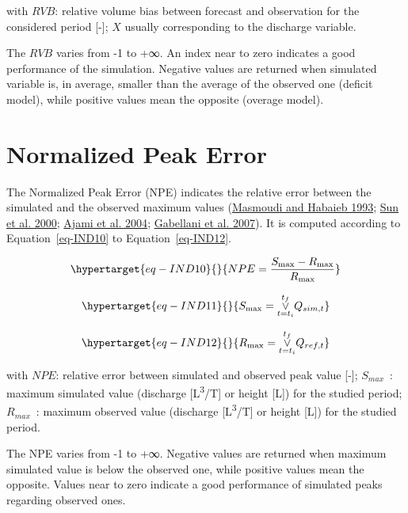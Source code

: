 \documentclass[
  letterpaper,
  DIV=11,
  numbers=noendperiod]{scrreprt}
\begin{document}
with \(RVB\): relative volume bias between forecast and observation for
the considered period {[}-{]}; \(X\) usually corresponding to the
discharge variable.

The \(RVB\) varies from -1 to +∞. An index near to zero indicates a good
performance of the simulation. Negative values are returned when
simulated variable is, in average, smaller than the average of the
observed one (deficit model), while positive values mean the opposite
(overage model).

\hypertarget{sec-tech_performance_indicators_npe}{%
\chapter{Normalized Peak
Error}\label{sec-tech_performance_indicators_npe}}

The Normalized Peak Error (NPE) indicates the relative error between the
simulated and the observed maximum values
(\protect\hyperlink{ref-masmoudi_performance_1993}{Masmoudi and Habaieb
1993}; \protect\hyperlink{ref-sun_flood_2000}{Sun et al. 2000};
\protect\hyperlink{ref-ajami_calibration_2004}{Ajami et al. 2004};
\protect\hyperlink{ref-gabellani_propagation_2007}{Gabellani et al.
2007}). It is computed according to Equation~\ref{eq-IND10} to
Equation~\ref{eq-IND12}.

\begin{equation}\protect\hypertarget{eq-IND10}{}{
NPE = \frac{S_{\max} - R_{\max}}{R_{\max}}
}\label{eq-IND10}\end{equation}

\begin{equation}\protect\hypertarget{eq-IND11}{}{
S_{\max} = \overset{t_{f}}{\underset{t = t_{i}}{\vee}}Q_{sim,t}
}\label{eq-IND11}\end{equation}

\begin{equation}\protect\hypertarget{eq-IND12}{}{
R_{\max} = \overset{t_{f}}{\underset{t = t_{i}}{\vee}}Q_{ref,t}
}\label{eq-IND12}\end{equation}

with \(NPE\): relative error between simulated and observed peak value
{[}-{]}; \(S_{max}\)~: maximum simulated value (discharge
{[}L\textsuperscript{3}/T{]} or height {[}L{]}) for the studied period;
\(R_{max}\)~: maximum observed value (discharge
{[}L\textsuperscript{3}/T{]} or height {[}L{]}) for the studied period.

The NPE varies from -1 to +∞. Negative values are returned when maximum
simulated value is below the observed one, while positive values mean
the opposite. Values near to zero indicate a good performance of
simulated peaks regarding observed ones.
\end{document}
